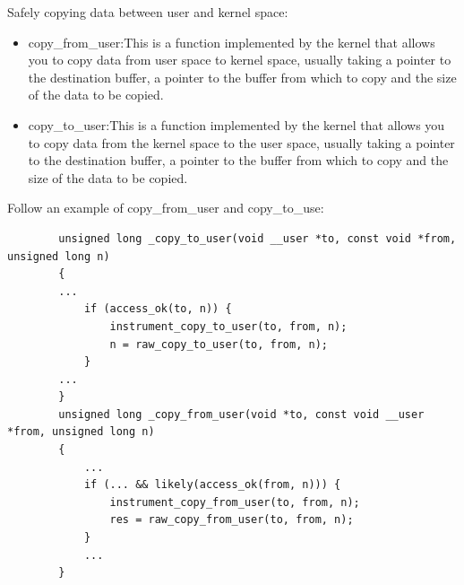     \clearpage
    Safely copying data between user and kernel space: 
    \begin{itemize}
        \item copy\_from\_user:This is a function implemented by the kernel that allows you to copy data from user space to kernel space, usually taking a pointer to the destination buffer, a pointer to the buffer from which to copy and the size of the data to be copied.\newline
        \item copy\_to\_user:This is a function implemented by the kernel that allows you to copy data from the kernel space to the user space, usually taking a pointer to the destination buffer, a pointer to the buffer from which to copy and the size of the data to be copied.\newline
    \end{itemize}
    Follow an example of copy\_from\_user and copy\_to\_use:\newline
    \begin{verbatim}
        unsigned long _copy_to_user(void __user *to, const void *from, unsigned long n) 
        { 
        ... 
            if (access_ok(to, n)) { 
                instrument_copy_to_user(to, from, n); 
                n = raw_copy_to_user(to, from, n); 
            } 
        ... 
        } 
        unsigned long _copy_from_user(void *to, const void __user *from, unsigned long n) 
        { 
            ... 
            if (... && likely(access_ok(from, n))) { 
                instrument_copy_from_user(to, from, n); 
                res = raw_copy_from_user(to, from, n); 
            } 
            ... 
        } 
    \end{verbatim}
